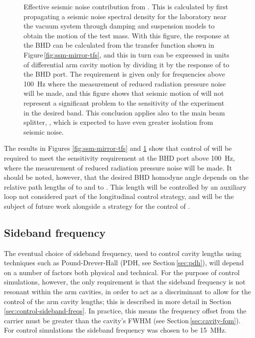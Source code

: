 \begin{figure}
  \centering
  
  \caption[Effective \LMINUS{} seismic noise contribution from \MSEVEN{}]{\label{fig:m7-seismic-noise}Effective \LMINUS{} seismic noise contribution from \MSEVEN{}. This is calculated by first propagating a seismic noise spectral density for the laboratory near the vacuum system through damping and suspension models to obtain the motion of the \MSEVEN{} test mass. With this figure, the response at the \gls{BHD} can be calculated from the transfer function shown in Figure\,\ref{fig:ssm-mirror-tfs}, and this in turn can be expressed in units of differential arm cavity motion by dividing it by the response of \LMINUS{} to the \gls{BHD} port. The requirement is given only for frequencies above \SI{100}{\hertz} where the measurement of reduced radiation pressure noise will be made, and this figure shows that seismic motion of \MSEVEN{} will not represent a significant problem to the sensitivity of the experiment in the desired band. This conclusion applies also to the main beam splitter, \MSIX{}, which is expected to have even greater isolation from seismic noise.}
\end{figure}

The results in Figures \ref{fig:ssm-mirror-tfs} and \ref{fig:m7-seismic-noise} show that control of \LMINUS{} will be required to meet the sensitivity requirement at the \gls{BHD} port above \SI{100}{\hertz}, where the measurement of reduced radiation pressure noise will be made. It should be noted, however, that the desired \gls{BHD} homodyne angle depends on the relative path lengths of \MELEVEN{} to \MSIXTEEN{} and \MSIX{} to \MSIXTEEN{}. This length will be controlled by an auxiliary loop not considered part of the longitudinal control strategy, and will be the subject of future work alongside a strategy for the control of \LPLUS{}.

\subsection{Sideband frequency}
The eventual choice of sideband frequency, used to control cavity lengths using techniques such as Pound-Drever-Hall (\gls{PDH}, see Section\,\ref{sec:pdh}), will depend on a number of factors both physical and technical. For the purpose of control simulations, however, the only requirement is that the sideband frequency is not resonant within the arm cavities, in order to act as a discriminant to allow for the control of the arm cavity lengths; this is described in more detail in Section\,\ref{sec:control-sideband-freqs}. In practice, this means the frequency offset from the carrier must be greater than the cavity's \gls{FWHM} (see Section\,\ref{sec:cavity-fom}). For control simulations the sideband frequency was chosen to be \SI{15}{\mega\hertz}.

